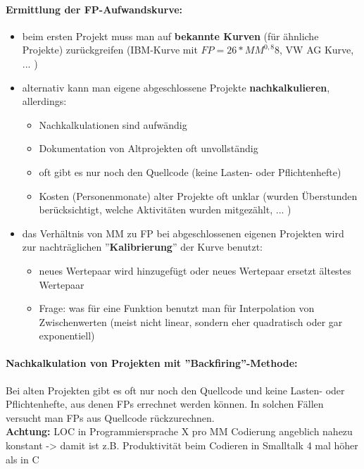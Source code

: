 \paragraph{Ermittlung der FP-Aufwandskurve:}
\begin{itemize}
	\item beim ersten Projekt muss man auf \textbf{bekannte Kurven} (für ähnliche Projekte) zurückgreifen (IBM-Kurve mit $FP = 26 * MM^{0,8}8$, VW AG Kurve, ... )
	\item alternativ kann man eigene abgeschlossene Projekte \textbf{nachkalkulieren}, allerdings:
	\begin{itemize}
		\item Nachkalkulationen sind aufwändig
		\item Dokumentation von Altprojekten oft unvollständig
		\item oft gibt es nur noch den Quellcode (keine Lasten- oder Pflichtenhefte)
		\item Kosten (Personenmonate) alter Projekte oft unklar (wurden Überstunden berücksichtigt, welche Aktivitäten wurden mitgezählt, ... )
	\end{itemize}
	\item das Verhältnis von MM zu FP bei abgeschlossenen eigenen Projekten wird zur nachträglichen ''\textbf{Kalibrierung}'' der Kurve benutzt:
	\begin{itemize}
		\item neues Wertepaar wird hinzugefügt oder neues Wertepaar ersetzt ältestes Wertepaar
		\item Frage: was für eine Funktion benutzt man für Interpolation von Zwischenwerten (meist nicht linear, sondern eher quadratisch oder gar exponentiell)
	\end{itemize}
\end{itemize}

\paragraph{Nachkalkulation von Projekten mit ''Backfiring''-Methode:}
Bei alten Projekten gibt es oft nur noch den Quellcode und keine Lasten- oder Pflichtenhefte, aus denen FPs errechnet werden können. In solchen Fällen versucht man FPs aus Quellcode rückzurechnen.
\\
\textbf{Achtung:} LOC in Programmiersprache X pro MM Codierung angeblich nahezu konstant -> damit ist z.B. Produktivität beim Codieren in Smalltalk 4 mal höher als in C

